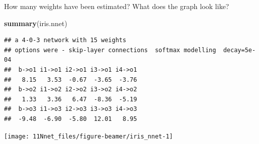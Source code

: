 \documentclass[10pt,ignorenonframetext,]{beamer}
\newenvironment{Shaded}{\begin{snugshade}}{\end{snugshade}}
\newcommand{\KeywordTok}[1]{\textcolor[rgb]{0.13,0.29,0.53}{\textbf{#1}}}
\newcommand{\NormalTok}[1]{#1}
\begin{document}
\begin{frame}[fragile]

How many weights have been estimated? What does the graph look like?

\scriptsize

\begin{Shaded}
\begin{Highlighting}[]
\KeywordTok{summary}\NormalTok{(iris.nnet)}
\end{Highlighting}
\end{Shaded}

\begin{verbatim}
## a 4-0-3 network with 15 weights
## options were - skip-layer connections  softmax modelling  decay=5e-04
##  b->o1 i1->o1 i2->o1 i3->o1 i4->o1 
##   8.15   3.53  -0.67  -3.65  -3.76 
##  b->o2 i1->o2 i2->o2 i3->o2 i4->o2 
##   1.33   3.36   6.47  -8.36  -5.19 
##  b->o3 i1->o3 i2->o3 i3->o3 i4->o3 
##  -9.48  -6.90  -5.80  12.01   8.95
\end{verbatim}

\end{frame}

\begin{frame}

\begin{center}\texttt{[image: 11Nnet\_files/figure-beamer/iris\_nnet-1]} \end{center}

\end{frame}
\end{document}
